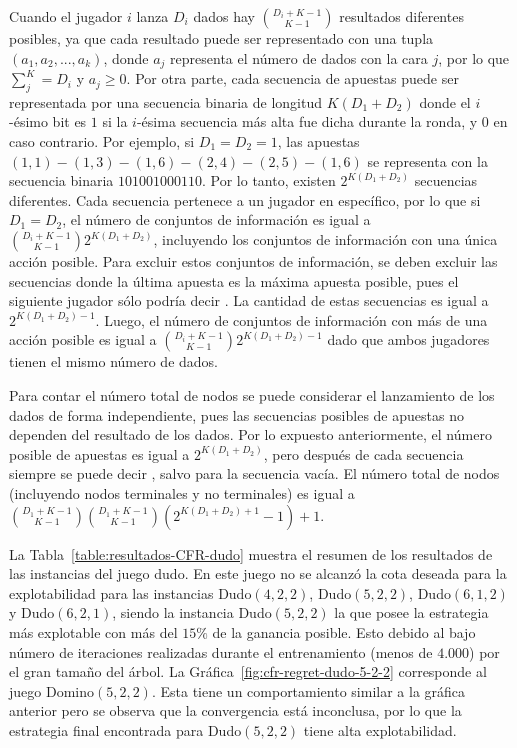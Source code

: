 Cuando el jugador $i$ lanza $D_i$ dados hay $\binom{D_i+K-1}{K-1}$ resultados diferentes posibles, ya que cada resultado puede ser representado con una tupla $(a_1, a_2, ..., a_k)$, donde $a_j$ representa el número de dados con la cara $j$, por lo que $\sum_j^K = D_i$ y $a_j \geq 0$. Por otra parte, cada secuencia de apuestas puede ser representada por una secuencia binaria de longitud $K(D_1 + D_2)$ donde el $i$-ésimo bit es $1$ si la $i$-ésima secuencia más alta fue dicha durante la ronda, y $0$ en caso contrario. Por ejemplo, si $D_1 = D_2 = 1$, las apuestas $(1, 1)-(1, 3)-(1, 6)-(2, 4)-(2, 5)-(1, 6)$ se representa con la secuencia binaria $101001000110$. Por lo tanto, existen $2^{K(D_1 + D_2)}$ secuencias diferentes. Cada secuencia pertenece a un jugador en específico, por lo que si $D_1 = D_2$, el número de conjuntos de información es igual a  $\binom{D_i+K-1}{K-1}2^{K(D_1 + D_2)}$, incluyendo los conjuntos de información con una única acción posible. Para excluir estos conjuntos de información, se deben excluir las secuencias donde la última apuesta es la máxima apuesta posible, pues el siguiente jugador sólo podría decir . La cantidad de estas secuencias es igual a $2^{K(D_1 + D_2)-1}$. Luego, el número de conjuntos de información con más de una acción posible es igual a $\binom{D_i+K-1}{K-1}2^{K(D_1 + D_2)-1}$ dado que ambos jugadores tienen el mismo número de dados.

Para contar el número total de nodos se puede considerar el lanzamiento de los dados de forma independiente, pues las secuencias posibles de apuestas no dependen del resultado de los dados. Por lo expuesto anteriormente, el número posible de apuestas es igual a $2^{K(D_1+D_2)}$, pero después de cada secuencia siempre se puede decir , salvo para la secuencia vacía. El número total de nodos (incluyendo nodos terminales y no terminales) es igual a $\binom{D_1+K-1}{K-1}\binom{D_1+K-1}{K-1}(2^{K(D_1+D_2)+1}-1)+1$.

La Tabla~\ref{table:resultados-CFR-dudo} muestra el resumen de los resultados de las instancias del juego dudo. En este juego no se alcanzó la cota deseada para la explotabilidad para las instancias Dudo$(4, 2, 2)$, Dudo$(5, 2, 2)$, Dudo$(6, 1, 2)$ y Dudo$(6, 2, 1)$, siendo la instancia Dudo$(5, 2, 2)$ la que posee la estrategia más explotable con más del $15\%$ de la ganancia posible. Esto debido al bajo número de iteraciones realizadas durante el entrenamiento (menos de $4.000$) por el gran tamaño del árbol. La Gráfica~\ref{fig:cfr-regret-dudo-5-2-2} corresponde al juego Domino$(5, 2, 2)$. Esta tiene un comportamiento similar a la gráfica anterior pero se observa que la convergencia está inconclusa, por lo que la estrategia final encontrada para Dudo$(5, 2, 2)$ tiene alta explotabilidad.

